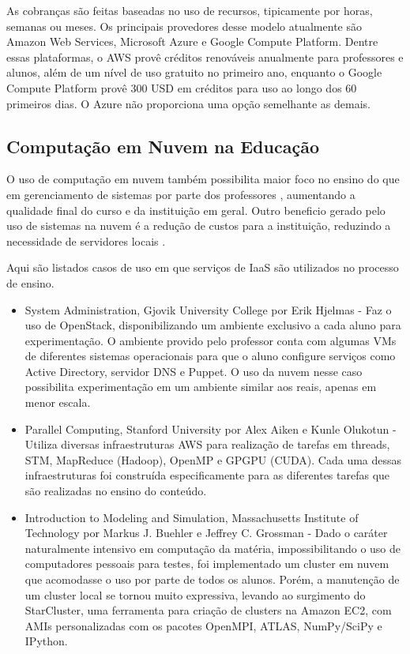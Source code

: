 \documentclass[tg]{mdtufsm}
\begin{document}
As cobranças são feitas baseadas no uso de recursos, tipicamente por horas, semanas ou meses. Os principais provedores desse modelo atualmente são Amazon Web Services, Microsoft Azure e Google Compute Platform. Dentre essas plataformas, o AWS provê créditos renováveis anualmente para professores e alunos, além de um nível de uso gratuito no primeiro ano, enquanto o Google Compute Platform provê 300 USD em créditos para uso ao longo dos 60 primeiros dias. O Azure não proporciona uma opção semelhante as demais.


\subsection{Computação em Nuvem na Educação}

O uso de computação em nuvem também possibilita maior foco no ensino do que em gerenciamento de sistemas por parte dos professores \cite{cloudedu}, aumentando a qualidade final do curso e da instituição em geral. Outro beneficio gerado pelo uso de sistemas na nuvem é a redução de custos para a instituição, reduzindo a necessidade de servidores locais \cite{toutcloud}.

Aqui são listados casos de uso em que serviços de IaaS são utilizados no processo de ensino.

\begin{itemize}
\item System Administration, Gjovik University College por Erik Hjelmas \cite{erik} - Faz o uso de OpenStack, disponibilizando um ambiente exclusivo a cada aluno para experimentação. O ambiente provido pelo professor conta com algumas VMs de diferentes sistemas operacionais para que o aluno configure serviços como Active Directory, servidor DNS e Puppet. O uso da nuvem nesse caso possibilita experimentação em um ambiente similar aos reais, apenas em menor escala.

\item Parallel Computing, Stanford University por Alex Aiken e Kunle Olukotun \cite{stanford} - Utiliza diversas infraestruturas AWS para realização de tarefas em threads, STM, MapReduce (Hadoop), OpenMP e GPGPU (CUDA). Cada uma dessas infraestruturas foi construída especificamente para as diferentes tarefas que são realizadas no ensino do conteúdo.

\item Introduction to Modeling and Simulation, Massachusetts Institute of Technology por Markus J. Buehler e Jeffrey C. Grossman  \cite{starclusterMIT} - Dado o caráter naturalmente intensivo em computação da matéria, impossibilitando o uso de computadores pessoais para testes, foi implementado um cluster em nuvem que acomodasse o uso por parte de todos os alunos. Porém, a manutenção de um cluster local se tornou muito expressiva, levando ao surgimento do StarCluster, uma ferramenta para criação de clusters na Amazon EC2, com AMIs personalizadas com os pacotes OpenMPI, ATLAS, NumPy/SciPy e IPython.
\end{itemize}
\end{document}
